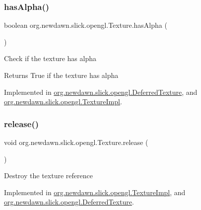 \mbox{\label{interfaceorg_1_1newdawn_1_1slick_1_1opengl_1_1_texture_a230a2e79b666be14738b585028fbe004}} 
\subsubsection{\texorpdfstring{has\+Alpha()}{hasAlpha()}}
{\footnotesize\ttfamily boolean org.\+newdawn.\+slick.\+opengl.\+Texture.\+has\+Alpha (\begin{DoxyParamCaption}{ }\end{DoxyParamCaption})}

Check if the texture has alpha

\begin{DoxyReturn}{Returns}
True if the texture has alpha 
\end{DoxyReturn}


Implemented in \mbox{\hyperlink{classorg_1_1newdawn_1_1slick_1_1opengl_1_1_deferred_texture_ab371ddf8921fb982ff180b8dcb395688}{org.\+newdawn.\+slick.\+opengl.\+Deferred\+Texture}}, and \mbox{\hyperlink{classorg_1_1newdawn_1_1slick_1_1opengl_1_1_texture_impl_ae07673bff3b44a0f681a8ec9a9a5fadf}{org.\+newdawn.\+slick.\+opengl.\+Texture\+Impl}}.

\mbox{\label{interfaceorg_1_1newdawn_1_1slick_1_1opengl_1_1_texture_a57d72d7a615be1b481410739479989a6}} 
\subsubsection{\texorpdfstring{release()}{release()}}
{\footnotesize\ttfamily void org.\+newdawn.\+slick.\+opengl.\+Texture.\+release (\begin{DoxyParamCaption}{ }\end{DoxyParamCaption})}

Destroy the texture reference 

Implemented in \mbox{\hyperlink{classorg_1_1newdawn_1_1slick_1_1opengl_1_1_texture_impl_ad039511f5655274072eac9595411d969}{org.\+newdawn.\+slick.\+opengl.\+Texture\+Impl}}, and \mbox{\hyperlink{classorg_1_1newdawn_1_1slick_1_1opengl_1_1_deferred_texture_a325dc5462234780a1c290225350354e5}{org.\+newdawn.\+slick.\+opengl.\+Deferred\+Texture}}.

